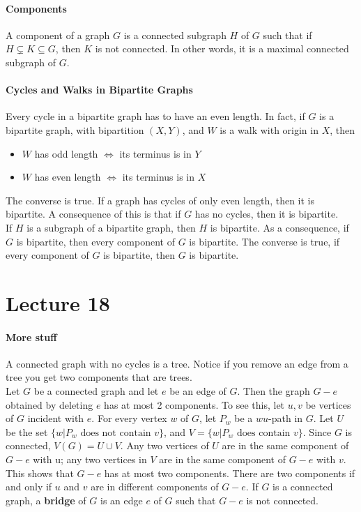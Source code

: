 \documentclass[10pt,letter]{article}
\begin{document}
\paragraph{Components}
A component of a graph $G$ is a connected subgraph $H$ of $G$ such that if $H\varsubsetneq K\subseteq G$, then $K$ is not connected. In other words, it is a maximal connected subgraph of $G$. 

\paragraph{Cycles and Walks in Bipartite Graphs}
Every cycle in a bipartite graph has to have an even length. In fact, if $G$ is a bipartite graph, with bipartition $(X,Y)$, and $W$ is a walk with origin in $X$, then \begin{itemize}
    \item $W$ has odd length $\Leftrightarrow$ its terminus is in $Y$ 
    \item $W$ has even length $\Leftrightarrow$ its terminus is in $X$
\end{itemize}
The converse is true. If a graph has cycles of only even length, then it is bipartite. A consequence of this is that if $G$ has no cycles, then it is bipartite. \\ 
If $H$ is a subgraph of a bipartite graph, then $H$ is bipartite. As a consequence, if $G$ is bipartite, then every component of $G$ is bipartite. The converse is true, if every component of $G$ is bipartite, then $G$ is bipartite. 

\section*{Lecture 18}
\paragraph{More stuff}
A connected graph with no cycles is a tree. Notice if you remove an edge from a tree you get two components that are trees. \\ 
Let $G$ be a connected graph and let $e$ be an edge of $G$. Then the graph $G-e$ obtained by deleting $e$ has at most 2 components. To see this, let $u,v$ be vertices of $G$ incident with $e$. For every vertex $w$ of $G$, let $P_w$ be a $wu$-path in $G$. Let $U$ be the set $\{w|P_w\text{ does not contain }v\}$, and $V=\{w|P_w\text{ does contain }v\}$. Since $G$ is connected, $V(G)=U\cup V$. Any two vertices of $U$ are in the same component of $G-e$ with  u; any two vertices in $V$ are in the same component of $G-e$ with $v$. This shows that $G-e$ has at most two components. There are two components if and only if $u$ and $v$ are in different components of $G-e$. If $G$ is a connected graph, a \textbf{bridge} of $G$ is an edge $e$ of $G$ such that $G-e$ is not connected.  
\end{document}
